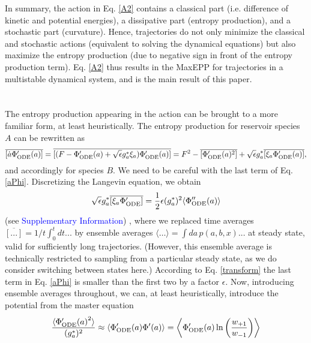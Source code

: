 \documentclass[aps,prl,reprint,singlecolumn,superscriptaddress]{revtex4}
\begin{document}
{In summary, the action in Eq. \ref{A2} contains a classical part (i.e. difference of kinetic and potential energies),  
a dissipative part (entropy production), and a stochastic part (curvature). Hence, trajectories do not only minimize the 
classical and stochastic actions (equivalent to solving the dynamical equations) but also maximize the entropy production 
(due to negative sign in front of the entropy production term). Eq. \ref{A2} thus results in the MaxEPP for trajectories 
in a multistable dynamical system, and is the main result of this paper.\\


\ \\
\\
The entropy production appearing in the action can be brought to a more familiar form, at least heuristically.
The entropy production for reservoir species $A$ can be rewritten as
\begin{equation}
\overline{[\dot a\Phi'_{\rm ODE}(a)]}=\overline{[(F-\Phi'_{\rm ODE}(a)+\sqrt{\epsilon}g_a^*\xi_a)\Phi'_{\rm ODE}(a)]}=
F^2-\overline{[\Phi'_{\rm ODE}(a)^2]}+\sqrt{\epsilon}g_a^*\overline{[\xi_a\Phi'_{\rm ODE}(a)]},\label{aPhi}
\end{equation}
and accordingly for species $B$. We need to be careful with the last term of Eq. \ref{aPhi}. Discretizing the Langevin equation, we obtain 
\begin{equation}
\sqrt{\epsilon}g_a^*\overline{[\xi_a\Phi'_{\rm ODE}]}=\frac{1}{2}\epsilon (g_a^*)^2\langle\Phi''_{\rm ODE}(a)\rangle\label{transform}
\end{equation}
(see \textcolor{blue}{Supplementary Information}) \cite{tome97,tome06,xiao09}, where we replaced time averages 
$\overline{[...]}=1/t\int_0^tdt...$ by ensemble averages $\langle\dots\rangle=\int da\, p(a,b,x)...$ at steady state, valid for 
sufficiently long trajectories. (However, this ensemble average is technically restricted to sampling from a particular steady state, 
as we do consider switching between states here.)  
According to Eq. \ref{transform} the last term in Eq. \ref{aPhi} is smaller than the first two by a factor $\epsilon$. 
Now, introducing ensemble averages throughout, we can, at least heuristically, introduce the potential from the master equation
\begin{equation}
\frac{\langle{\Phi'_{\rm ODE}(a)}^2\rangle}{(g_a^*)^2}
\approx\langle\Phi'_{\rm ODE}(a)\Phi'(a)\rangle=\left\langle\Phi'_{\rm ODE}(a)\ln\left(\frac{w_{+1}}{w_{-1}}\right)\right\rangle

\end{equation}}
\end{document}
